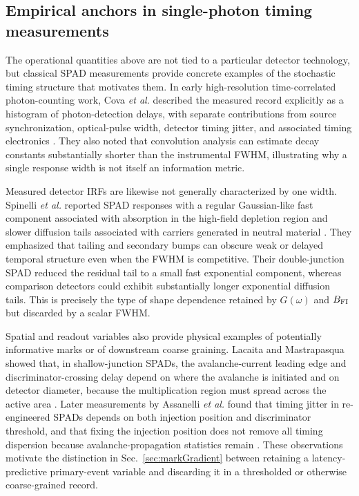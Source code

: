 \subsection{Empirical anchors in single-photon timing measurements}
\label{sec:empiricalAnchors}

The operational quantities above are not tied to a particular detector technology, but classical SPAD measurements provide concrete examples of the stochastic timing structure that motivates them. In early high-resolution time-correlated photon-counting work, Cova \emph{et al.} described the measured record explicitly as a histogram of photon-detection delays, with separate contributions from source synchronization, optical-pulse width, detector timing jitter, and associated timing electronics \cite{Cova1989}. They also noted that convolution analysis can estimate decay constants substantially shorter than the instrumental FWHM, illustrating why a single response width is not itself an information metric.

Measured detector IRFs are likewise not generally characterized by one width. Spinelli \emph{et al.} reported SPAD responses with a regular Gaussian-like fast component associated with absorption in the high-field depletion region and slower diffusion tails associated with carriers generated in neutral material \cite{Spinelli1998}. They emphasized that tailing and secondary bumps can obscure weak or delayed temporal structure even when the FWHM is competitive. Their double-junction SPAD reduced the residual tail to a small fast exponential component, whereas comparison detectors could exhibit substantially longer exponential diffusion tails. This is precisely the type of shape dependence retained by $G(\omega)$ and $B_{\rm FI}$ but discarded by a scalar FWHM.

Spatial and readout variables also provide physical examples of potentially informative marks or of downstream coarse graining. Lacaita and Mastrapasqua showed that, in shallow-junction SPADs, the avalanche-current leading edge and discriminator-crossing delay depend on where the avalanche is initiated and on detector diameter, because the multiplication region must spread across the active area \cite{LacaitaMastrapasqua1990}. Later measurements by Assanelli \emph{et al.} found that timing jitter in re-engineered SPADs depends on both injection position and discriminator threshold, and that fixing the injection position does not remove all timing dispersion because avalanche-propagation statistics remain \cite{Assanelli2011}. These observations motivate the distinction in Sec.~\ref{sec:markGradient} between retaining a latency-predictive primary-event variable and discarding it in a thresholded or otherwise coarse-grained record.

